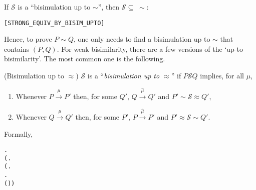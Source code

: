 \begin{theorem}
If $\mathcal{S}$ is a ``bisimulation up to $\sim$'', then
$\mathcal{S} \subseteq\;\sim$:
\begin{alltt}
\HOLTokenTurnstile{}   \HOLSymConst{\HOLTokenConj{}}    \HOLSymConst{\HOLTokenImp{}}  \HOLSymConst{\HOLTokenStrongEQ} \hfill{[STRONG_EQUIV_BY_BISIM_UPTO]}
\end{alltt}
\end{theorem}
Hence, to prove $P \sim Q$, one only needs to find a bisimulation
up to $\sim$ that contains $(P, Q)$.
For weak bisimilarity, there are a few versions of the `up-to
  bisimilarity'. The most common one is the following.

\begin{definition}{(Bisimulation up to $\approx$)}
$\mathcal{S}$ is a ``\emph{bisimulation up to $\approx$}'' if $P
  \mathcal{S} Q$ implies, for all $\mu$,
\begin{enumerate}
\item Whenever $P \overset{\mu}{\rightarrow} P'$ then, for some
  $Q'$, $Q \overset{\hat{\mu}}{\rightarrow} Q'$ and $P' \sim \mathcal{S}
  \approx Q'$,
\item Whenever $Q \overset{\mu}{\rightarrow} Q'$ then, for some
  $P'$, $P \overset{\hat{\mu}}{\rightarrow} P'$ and $P' \approx \mathcal{S}
  \sim Q'$.
\end{enumerate}
Formally,
\begin{alltt}
  \HOLSymConst{\HOLTokenDefEquality{}}
  \HOLSymConst{\HOLTokenForall{}} .
         \HOLSymConst{\HOLTokenImp{}}
      (\HOLSymConst{\HOLTokenForall{}}.
           (\HOLSymConst{\HOLTokenForall{}}.
                 \HOLTokenTransBegin{} \HOLTokenTransEnd {} \HOLSymConst{\HOLTokenImp{}}
                \HOLSymConst{\HOLTokenExists{}}.
                     \HOLTokenWeakTransBegin{} \HOLTokenImp{}  \HOLSymConst{\HOLTokenConj{}}
                    ( \HOLSymConst{\HOLTokenRCompose{}}  \HOLSymConst{\HOLTokenRCompose{}} )  ) \HOLSymConst{\HOLTokenConj{}}

\end{alltt}
\end{definition}
